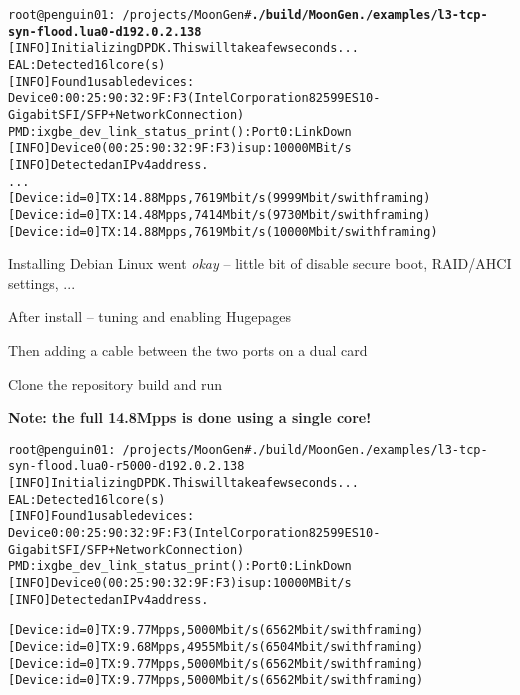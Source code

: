 \documentclass[Screen16to9,17pt]{foils}
\begin{document}

\begin{alltt}\footnotesize
root@penguin01:~/projects/MoonGen# {\bf ./build/MoonGen ./examples/l3-tcp-syn-flood.lua 0 -d 192.0.2.138}
[INFO]  Initializing DPDK. This will take a few seconds...
EAL: Detected 16 lcore(s)
[INFO]  Found 1 usable devices:
   Device 0: 00:25:90:32:9F:F3 (Intel Corporation 82599ES 10-Gigabit SFI/SFP+ Network Connection)
PMD: ixgbe_dev_link_status_print():  Port 0: Link Down
[INFO]  Device 0 (00:25:90:32:9F:F3) is up: 10000 MBit/s
[INFO]  Detected an IPv4 address.
...
[Device: id=0] TX: 14.88 Mpps, 7619 Mbit/s (9999 Mbit/s with framing)
[Device: id=0] TX: 14.48 Mpps, 7414 Mbit/s (9730 Mbit/s with framing)
[Device: id=0] TX: 14.88 Mpps, 7619 Mbit/s (10000 Mbit/s with framing)
\end{alltt}

\begin{list2}
\item Installing Debian Linux went \emph{okay} -- little bit of disable secure boot, RAID/AHCI settings, ...
\item After install -- tuning and enabling Hugepages
\item Then adding a cable between the two ports on a dual card
\item Clone the repository  build and run
\item {\bf Note: the full 14.8Mpps is done using a single core!}
\end{list2}


\begin{alltt}\footnotesize
root@penguin01:~/projects/MoonGen# ./build/MoonGen ./examples/l3-tcp-syn-flood.lua 0 -r 5000 -d 192.0.2.138
[INFO]  Initializing DPDK. This will take a few seconds...
EAL: Detected 16 lcore(s)
[INFO]  Found 1 usable devices:
   Device 0: 00:25:90:32:9F:F3 (Intel Corporation 82599ES 10-Gigabit SFI/SFP+ Network Connection)
PMD: ixgbe_dev_link_status_print():  Port 0: Link Down
[INFO]  Device 0 (00:25:90:32:9F:F3) is up: 10000 MBit/s
[INFO]  Detected an IPv4 address.

[Device: id=0] TX: 9.77 Mpps, 5000 Mbit/s (6562 Mbit/s with framing)
[Device: id=0] TX: 9.68 Mpps, 4955 Mbit/s (6504 Mbit/s with framing)
[Device: id=0] TX: 9.77 Mpps, 5000 Mbit/s (6562 Mbit/s with framing)
[Device: id=0] TX: 9.77 Mpps, 5000 Mbit/s (6562 Mbit/s with framing)
\end{alltt}
\end{document}
